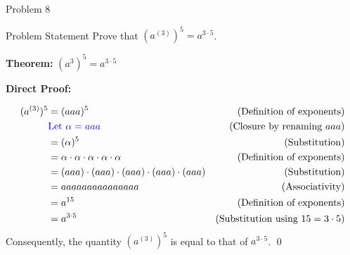\begin{problem}{Problem 8}
    \begin{statement}{Problem Statement}
        Prove that $(a^{(3)})^{5} = a^{3\cdot5}$.
    \end{statement}

    \begin{Highlight}[Solution]
        \textbf{Theorem:} $(a^{3})^{5} = a^{3\cdot 5}$ \vspace*{1em}

        \textbf{Direct Proof:} \vspace*{1em}

        \begin{align*}
            (a^{(3)})^{5} & = (aaa)^{5} & \text{(Definition of exponents)} \\
            & \textcolor{blue}{\text{Let } \alpha = aaa} & \text{(Closure by renaming $aaa$)} \\
            & = (\alpha)^{5} & \text{(Substitution)} \\
            & = \alpha \cdot \alpha \cdot \alpha \cdot \alpha \cdot \alpha & \text{(Definition of exponents)} \\
            & = (aaa) \cdot (aaa) \cdot (aaa) \cdot (aaa) \cdot (aaa) & \text{(Substitution)} \\
            & = aaaaaaaaaaaaaaa & \text{(Associativity)} \\
            & = a^{15} & \text{(Definition of exponents)} \\
            & = a^{3\cdot 5} & \text{(Substitution using $15 = 3 \cdot 5$)}
        \end{align*}
        Consequently, the quantity $(a^{(3)})^{5}$ is equal to that of $a^{3 \cdot 5}$. \qed
    \end{Highlight}
\end{problem}


